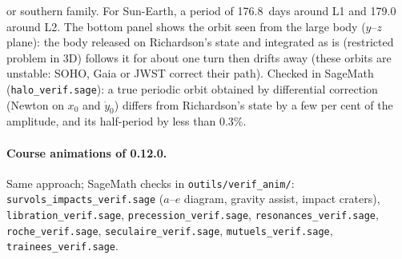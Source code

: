 \begin{itemize}
or southern family. For Sun-Earth, a period of 176.8~days around L1 and 179.0 around L2. The bottom panel shows the
orbit seen from the large body ($y$--$z$ plane): the body released on Richardson's state and integrated as is
(restricted problem in 3D) follows it for about one turn then drifts away (these orbits are unstable: SOHO, Gaia or
JWST correct their path). Checked in SageMath (\texttt{halo\_verif.sage}): a true periodic orbit obtained by
differential correction (Newton on $x_0$ and $\dot y_0$) differs from Richardson's state by a few per cent of the
amplitude, and its half-period by less than 0.3\%.
\end{itemize}

\paragraph{Course animations of 0.12.0.} Same approach; SageMath checks in \texttt{outils/verif\_anim/}:
\texttt{survols\_impacts\_verif.sage} ($a$--$e$ diagram, gravity assist, impact craters),
\texttt{libration\_verif.sage}, \texttt{precession\_verif.sage}, \texttt{resonances\_verif.sage},
\texttt{roche\_verif.sage}, \texttt{seculaire\_verif.sage}, \texttt{mutuels\_verif.sage}, \texttt{trainees\_verif.sage}.
